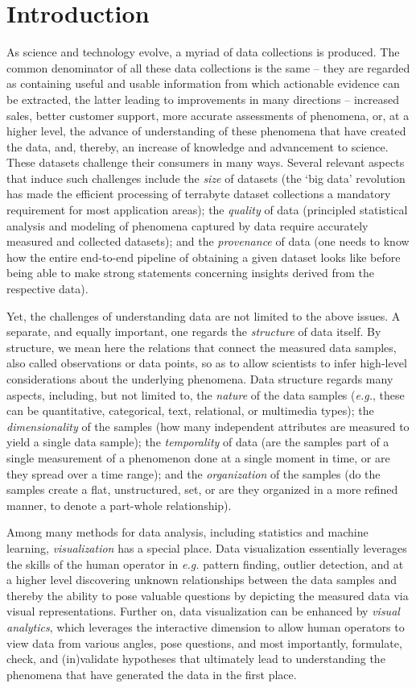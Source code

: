 \chapter{Introduction}
\label{ch:intro}
%
As science and technology evolve, a myriad of data collections is produced. The common denominator of all these data collections is the same -- they are regarded as containing useful and usable information from which actionable evidence can be extracted, the latter leading to improvements in many directions -- increased sales, better customer support, more accurate assessments of phenomena, or, at a higher level, the advance of understanding of these phenomena that have created the data, and, thereby, an increase of knowledge and advancement to science. These datasets challenge their consumers in many ways. Several relevant aspects that induce such challenges include the \emph{size} of datasets (the `big data' revolution has made the efficient processing of terrabyte dataset collections a mandatory requirement for most application areas); the \emph{quality} of data (principled statistical analysis and modeling of phenomena captured by data require accurately measured and collected datasets); and the \emph{provenance} of data (one needs to know how the entire end-to-end pipeline of obtaining a given dataset looks like before being able to make strong statements concerning insights derived from the respective data).

Yet, the challenges of understanding data are not limited to the above issues. A separate, and equally important, one regards the \emph{structure} of data itself. By structure, we mean here the relations that connect the measured data samples, also called observations or data points, so as to allow scientists to infer high-level considerations about the underlying phenomena. Data structure regards many aspects, including, but not limited to, the \emph{nature} of the data samples (\emph{e.g.}, these can be quantitative, categorical, text, relational, or multimedia types); the \emph{dimensionality} of the samples (how many independent attributes are measured to yield a single data sample); the \emph{temporality} of data (are the samples part of a single measurement of a phenomenon done at a single moment in time, or are they spread over a time range); and the \emph{organization} of the samples (do the samples create a flat, unstructured, set, or are they organized in a more refined manner, to denote a part-whole relationship).

Among many methods for data analysis, including statistics and machine learning, \emph{visualization} has a special place. Data visualization essentially leverages the skills of the human operator in \emph{e.g.} pattern finding, outlier detection, and at a higher level discovering unknown relationships between the data samples and thereby the ability to pose valuable questions by depicting the measured data via visual representations. Further on, data visualization can be enhanced by \emph{visual analytics}, which leverages the interactive dimension to allow human operators to view data from various angles, pose questions, and most importantly, formulate, check, and (in)validate hypotheses that ultimately lead to understanding the phenomena that have generated the data in the first place.

